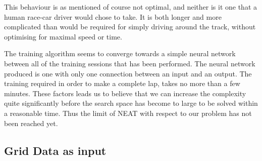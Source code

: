 This behaviour is as mentioned of course not optimal, and neither is it one that a human race-car driver would chose to take. It is both longer and more complicated than would be required for simply driving around the track, without optimising for maximal speed or time.

The training algorithm seems to converge towards a simple neural network between all of the training sessions that has been performed. The neural network produced is one with only one connection between an input and an output. The training required in order to make a complete lap, takes no more than a few minutes. These factors leads us to believe that we can increase the complexity quite significantly before the search space has become to large to be solved within a reasonable time. Thus the limit of NEAT with respect to our problem has not been reached yet.


\subsection{Grid Data as input}

\iffalse
General structure for the results of an experiment:
- Shortly describe the experiment and reference to the description in Method
- Result data (See below)
- Stages in the learning development
  - Did it get stuck at some point?
- What the behaviour became
  - Description
  - Image with interesting racing lines
- Analyse
- Compare to other experiments (if feasible)

Result data:
- Training time
 - Number of generations etc.
 - Number of evaluations
- Fitness
- Analysis of behaviour, may be of different aspects
- Settings variables
- Topology of network
 - measurements of different kinds?


\fi